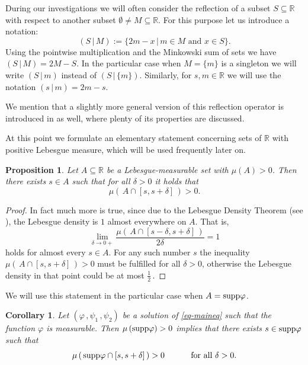 \documentclass[12pt]{amsart}
\newtheorem{prop}{Proposition}
\newtheorem{coro}{Corollary}
\theoremstyle{remark}
\theoremstyle{definition}
\newcommand{\RR}{\mathbb{R}}
\newcommand{\supp}{\mbox{\rm supp}}
\newcommand{\rfl}[2]{\left( #1 \, \vert \, #2 \right)}
\begin{document}
During our investigations 
we will often consider the reflection of a subset 
$ S \subseteq \RR $ with respect to 
another subset $ \emptyset \neq M \subseteq \RR $. 
For this purpose let us introduce a notation: 
\[
\rfl{S}{M} := 
\lbrace
2m - x \, \vert \, m \in M \mbox{ and } x \in S 
\rbrace. 
\] 
Using the pointwise multiplication and the 
Minkowski sum of sets we have $ \rfl{S}{M} = 2 M - S $. 
In the particular case when 
$ M = \lbrace m \rbrace $ is a singleton 
we will write 
$ \rfl{S}{m} $ instead of $ \rfl{S}{ \lbrace m \rbrace } $. 
Similarly, for 
$ s,m \in \RR $ we will use the notation 
$ \rfl{s}{m} = 2m-s $. 

We mention that a slightly more general version of 
this reflection operator is introduced in 
\cite{Kis24} as well, 
where plenty of its properties are discussed. 

At this point we formulate an elementary statement 
concerning sets of $ \RR $ with positive Lebesgue measure, 
which will be used frequently later on. 
\begin{prop}\label{prop-measure}
Let $ A \subseteq \RR $ be a Lebesgue-measurable set 
with $ \mu (A) > 0 $. 
Then there exists $ s \in A $ such that 
for all $\delta > 0$ it holds that 
\[
\mu \left( \, A \cap \left[ s, s+\delta \right] \, \right) > 0. 
\]
\end{prop}

\begin{proof}
In fact much more is true, since due to the 
Lebesgue Density Theorem 
(see \cite[Theorem 21.29]{vRS82}), the Lebesgue density is 
$ 1 $ almost everywhere on $ A $. That is, 
\[
\lim_{\delta \to 0+} 
\frac{\mu \left( \, 
A \cap \left[ s - \delta, s + \delta \right] \, \right)}
{2 \delta} 
= 1 
\]
holds for almost every $ s \in A $. 
For any such number $ s $ the inequality 
$ \mu \left( \, A \cap 
\left[ s, s+\delta \right] \, \right) > 0 $ must 
be fulfilled for all $ \delta > 0 $, 
otherwise the Lebesgue density in that point could 
be at most $ \frac{1}{2} \,$. 
\end{proof}

We will use this statement in the particular case when 
$ A = \supp \varphi $. 

\begin{coro}\label{coro-positive_measure}
Let 
$ \left( \varphi \,, \psi_1 \,, \psi_2 \right) $ 
be a solution of \eqref{eq-maineq} such that 
the function $ \varphi $ is measurable. 
Then 
$ \mu \left( \supp \varphi \right) > 0 $ 
implies that there exists 
$ s \in \supp \varphi $ such that 
\[
\mu \left( \, \supp \varphi \cap 
\left[ s, s + \delta \right] \, \right) > 0 
\hspace{10 mm} 
\mbox{ for all } \delta > 0. 
\] 
\end{coro}
\end{document}
